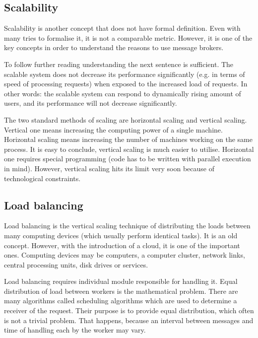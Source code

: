 \subsection{Scalability}
\label{subsec:scalability}
Scalability is another concept that does not have formal definition\cite{scalability}. Even with many tries to formalise it, it is not a comparable metric. However, it is one of the key concepts in order to understand the reasons to use message brokers.

To follow further reading understanding the next sentence is sufficient. The scalable system does not decrease its performance significantly (e.g. in terms of speed of processing requests) when exposed to the increased load of requests. In other words: the scalable system can respond to dynamically rising amount of users, and its performance will not decrease significantly. 

The two standard methods of scaling are horizontal scaling and vertical scaling. Vertical one means increasing the computing power of a single machine. Horizontal scaling means increasing the number of machines working on the same process. It is easy to conclude, vertical scaling is much easier to utilise. Horizontal one requires special programming (code has to be written with parallel execution in mind). However, vertical scaling hits its limit very soon because of technological constraints. 

\subsection{Load balancing}
\label{subsec:loadBalancing}

Load balancing is the vertical scaling technique of distributing the loads between many computing devices (which usually perform identical tasks). It is an old concept. However, with the introduction of a cloud, it is one of the important ones. Computing devices may be computers, a computer cluster, network links, central processing units, disk drives or services.

Load balancing requires individual module responsible for handling it. Equal distribution of load between workers is the mathematical problem. There are many algorithms called scheduling algorithms which are used to determine a receiver of the request. Their purpose is to provide equal distribution, which often is not a trivial problem. That happens, because an interval between messages and time of handling each by the worker may vary.  

